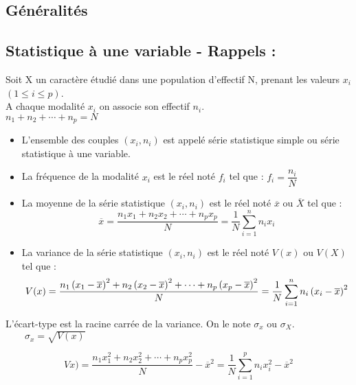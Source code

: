 
\everymath{\displaystyle}


\subsection{Généralités }
\subsection*{Statistique à une variable - Rappels :}
Soit X un caractère étudié dans une population d’effectif N, prenant les valeurs $ x_{i} $ $( 1\leq i \leq p)$.\\
A chaque modalité $ x_{i} $ on associe son effectif $ n_{i} $.\\
$n_{1} + n_{2} + \cdots+ n_{p}  =  N$


\begin{definition}

\begin{itemize}
\item L’ensemble des couples $(x_i, n_i)$ est appelé série statistique simple ou série statistique à une variable.
\item La fréquence de la modalité $x_i$ est le réel noté $f_i$ tel que : $f_i = \dfrac{n_i}{N}$
\item La moyenne de la série statistique $(x_i,n_i)$ est le réel noté  $ \overline{x} $ ou       $ \overline{X} $ tel que : $$ \overline{x} = \dfrac{n_{1}x_{1}+n_{2}x_{2}+\cdots +n_{p}x_{p}}{N}=\dfrac{1}{N}\sum_{i=1}^n n_{i}x_{i} $$
\item La variance de la série statistique  $(x_i,n_i)$  est le réel noté  $V(x)$ ou $V(X)$ tel que :
$$V(x)= \dfrac{n_{1}\left(x_{1}-\overline{x}\right)^{2}+n_{2}\left(x_{2}-\overline{x}\right)^{2}+\cdots +n_{p}\left(x_{p}-\overline{x}\right)^{2}}{N}=\dfrac{1}{N}\displaystyle\sum_{i=1}^n n_{i}\left(x_{i}-\overline{x}\right)^{2}$$
\end{itemize}
L’écart-type est la racine carrée de la variance. On le note  $ \sigma _{x} $ ou $ \sigma_X $. $\qquad \sigma_x=\sqrt{V(x)} $
\end{definition}

\begin{property}

 $$ Vx) = \dfrac{n_{1}x_{1}^{2}+n_{2}x_{2}^{2}+\cdots +n_{p}x_{p}^{2}}{N}-\overline{x}^{2}=\frac{1}{N}\sum_{i=1}^p n_{i}x_{i}^{2} -\overline{x}^{2}$$
\end{property}


